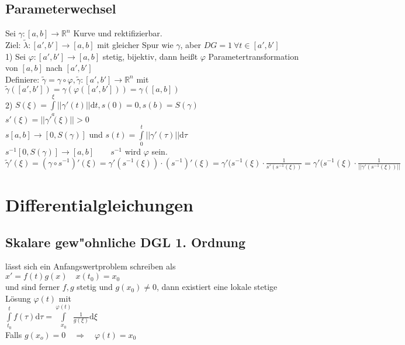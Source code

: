 \documentclass[10pt,a4paper^, twocolumn]{article}
\newcommand{\menge}{\mathbb} %
\renewcommand{\phi}{\varphi} %
\renewcommand{\d}{\mathrm{d}} %
\begin{document}
\subsection{Parameterwechsel}
Sei $\gamma : [a,b] \rightarrow \menge{R}^n$ Kurve und rektifizierbar. \\
Ziel: $\tilde\lambda : [a', b'] \rightarrow [a,b]$ mit gleicher Spur wie $\gamma$, aber $DG = 1 \ \forall t \in [a', b']$ \\
1)  Sei $\phi:[a', b'] \rightarrow [a,b]$ stetig, bijektiv, dann heißt $\phi$ Parametertransformation von $[a,b]$ nach $[a',b']$ \\
Definiere: $\tilde\gamma = \gamma \circ \phi, \tilde\gamma:[a', b'] \rightarrow \menge{R}^n$ mit $\tilde\gamma([a',b']) = \gamma(\phi([a',b'])) = \gamma([a,b])$ \\
2) $S(\xi) = \int\limits_a^\xi ||\gamma'(t)|| \d t, s(0) = 0, s(b) = S(\gamma)$ \\
$s'(\xi) = ||\gamma'(\xi)|| > 0$ \\
$s [a,b] \rightarrow [0, S(\gamma)]$ und $s(t) = \int\limits_0^t ||\gamma'(\tau)|| \d \tau $ \\
$s^{-1}[0,S(\gamma)] \rightarrow [a,b] \qquad s^{-1}$ wird $\phi$ sein. \\
$\tilde\gamma'(\xi) = (\gamma \circ s^{-1})'(\xi) = \gamma'(s^{-1}(\xi)) \cdot (s^{-1})'(\xi) = 
\gamma'(s^{-1}(\xi)\cdot \frac{1}{s'(s^{-1}(\xi))} = \gamma'(s^{-1}(\xi) \cdot \frac{1}{||\gamma'(s^{-1}(\xi))||}$




\section{Differentialgleichungen}
\subsection{Skalare gew"ohnliche DGL 1. Ordnung}
lässt sich ein Anfangswertproblem schreiben als \\ $x' = f(t)g(x) \quad x(t_0) = x_0$  \\
und sind ferner $f,g$ stetig und $g(x_0) \neq 0$, dann existiert eine lokale stetige Lösung $\phi(t)$ mit \\
$\int\limits_{t_0}^t f(\tau) \d \tau = \int\limits_{x_0}^{\phi(t)} \frac{1}{g(\xi)} \d \xi$ \\
Falls $g(x_o) = 0  \quad \Rightarrow \quad \phi(t) = x_0$
\end{document}
